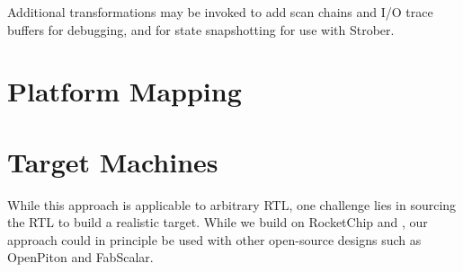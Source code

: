 Additional transformations may be invoked to add scan
chains and I/O trace buffers for debugging, and for state snapshotting for use
with Strober\cite{strober}.

\section{Platform Mapping}

\section{Target Machines}

While this approach is applicable to arbitrary RTL, one challenge lies in
sourcing the RTL to build a realistic target. While we build on RocketChip and
\RISCV, our approach could in principle be used with other open-source designs
such as OpenPiton\cite{openpiton} and FabScalar\cite{fabscalar}.
